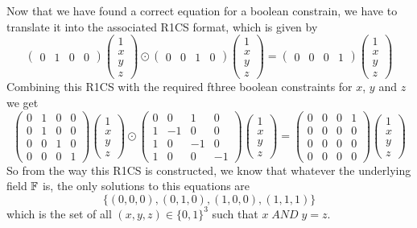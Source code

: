 Now that we have found a correct equation for a boolean constrain, we have to translate it into the associated R1CS format, which is given by 
$$
\begin{pmatrix}0 & 1 & 0 & 0 \end{pmatrix} \begin{pmatrix} 1 \\ x \\ y \\ z \end{pmatrix}\odot
\begin{pmatrix}0 & 0 & 1 & 0 \end{pmatrix} \begin{pmatrix} 1 \\ x \\ y \\ z \end{pmatrix} =
\begin{pmatrix}0 & 0 & 0 & 1 \end{pmatrix}\begin{pmatrix} 1 \\ x \\ y \\ z \end{pmatrix}
$$
Combining this R1CS with the required fthree boolean constraints for $x$, $y$ and $z$ we get
$$
\begin{pmatrix}
0 & 1 & 0 & 0 \\
\hline
0 & 1 & 0 & 0 \\
0 & 0 & 1 & 0 \\
0 & 0 & 0 & 1 
\end{pmatrix} \begin{pmatrix} 1 \\ x \\ y \\ z \end{pmatrix}\odot
\begin{pmatrix}
0 & 0 & 1 & 0 \\
\hline
1 & -1 & 0 & 0 \\
1 & 0  & -1 & 0 \\
1 & 0 & 0 & -1 
\end{pmatrix} \begin{pmatrix} 1 \\ x \\ y \\ z \end{pmatrix} =
\begin{pmatrix}
0 & 0 & 0 & 1 \\
\hline
0 & 0 & 0 & 0 \\
0 & 0 & 0 & 0 \\
0 & 0 & 0 & 0 
\end{pmatrix}\begin{pmatrix} 1 \\ x \\ y \\ z \end{pmatrix}
$$
So from the way this R1CS is constructed, we know that whatever the underlying field $\mathbb{F}$ is, the only solutions to this equations are
$$
\{(0,0,0), (0,1,0), (1,0,0), (1,1,1)\}
$$
which is the set of all $(x,y,z)\in\{0,1\}^3$ such that $x\; AND\; y = z$.
